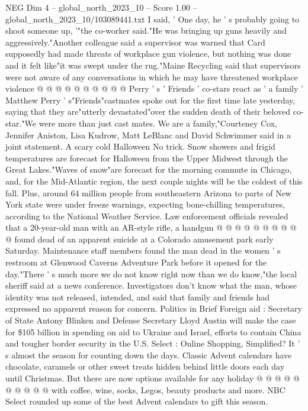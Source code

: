 \begin{textsample}{NEG Dim 4 – global\_north\_2023\_10 – Score 1.00 – global\_north\_2023\_10/103089441.txt}
I said, ' One day, he ' s probably going to shoot someone up, '"the co-worker said."He was bringing up guns heavily and aggressively."Another colleague said a supervisor was warned that Card supposedly had made threats of workplace gun violence, but nothing was done and it felt like"it was swept under the rug."Maine Recycling said that supervisors were not aware of any conversations in which he may have threatened workplace violence @ @ @ @ @ @ @ @ @ @ Perry ' s ' Friends ' co-stars react as ' a family ' Matthew Perry ' s"Friends"castmates spoke out for the first time late yesterday, saying that they are"utterly devastated"over the sudden death of their beloved co-star."We were more than just cast mates.
We are a family,"Courteney Cox, Jennifer Aniston, Lisa Kudrow, Matt LeBlanc and David Schwimmer said in a joint statement.
A scary cold Halloween No trick.
Snow showers and frigid temperatures are forecast for Halloween from the Upper Midwest through the Great Lakes."Waves of snow"are forecast for the morning commute in Chicago, and, for the Mid-Atlantic region, the next couple nights will be the coldest of this fall.
Plus, around 64 million people from southeastern Arizona to parts of New York state were under freeze warnings, expecting bone-chilling temperatures, according to the National Weather Service.
Law enforcement officials revealed that a 20-year-old man with an AR-style rifle, a handgun @ @ @ @ @ @ @ @ @ @ found dead of an apparent suicide at a Colorado amusement park early Saturday.
Maintenance staff members found the man dead in the women ' s restroom at Glenwood Caverns Adventure Park before it opened for the day."There ' s much more we do not know right now than we do know,"the local sheriff said at a news conference.
Investigators don't know what the man, whose identity was not released, intended, and said that family and friends had expressed no apparent reason for concern.
Politics in Brief Foreign aid : Secretary of State Antony Blinken and Defense Secretary Lloyd Austin will make the case for \$105 billion in spending on aid to Ukraine and Israel, efforts to contain China and tougher border security in the U.S.
Select : Online Shopping, Simplified?
It ' s almost the season for counting down the days.
Classic Advent calendars have chocolate, caramels or other sweet treats hidden behind little doors each day until Christmas.
But there are now options available for any holiday @ @ @ @ @ @ @ @ @ @ with coffee, wine, socks, Legos, beauty products and more.
NBC Select rounded up some of the best Advent calendars to gift this season.

\end{textsample}
